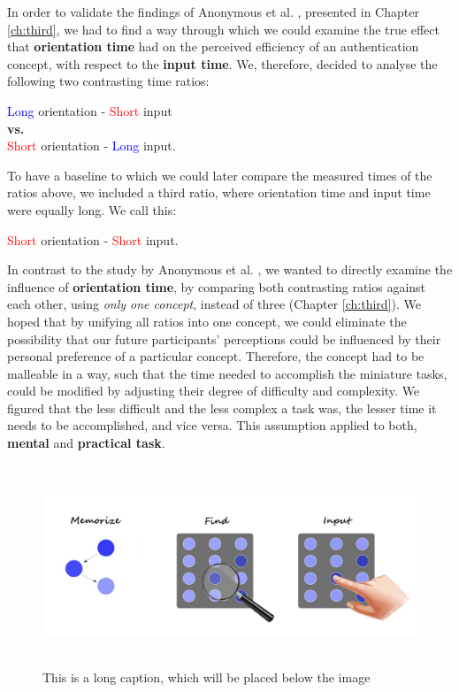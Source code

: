 In order to validate the findings of Anonymous et al. \cite{anonymous}, presented in Chapter \ref{ch:third}, we had to find a way through which we could examine the true effect that \textbf{orientation time} had on the perceived efficiency of an authentication concept, with respect to the \textbf{input time}. We, therefore, decided to analyse the following two contrasting time ratios: 
\begin{center}
    \textcolor{blue}{Long} orientation - \textcolor{red}{Short} input \\
    \textbf{vs.} \\
    \textcolor{red}{Short} orientation - \textcolor{blue}{Long} input.
\end{center} 

To have a baseline to which we could later compare the measured times of the ratios above, we included a third ratio, where orientation time and input time were equally long. We call this:  
\begin{center}
\textcolor{red}{Short} orientation - \textcolor{red}{Short} input.
\end{center} 

In contrast to the study by Anonymous et al. \cite{anonymous}, we wanted to directly examine the influence of \textbf{orientation time}, by comparing both contrasting ratios against each other, using \textit{only one concept}, instead of three (Chapter \ref{ch:third}). We hoped that by unifying all ratios into one concept, we could eliminate the possibility that our future participants' perceptions could be influenced by their personal preference of a particular concept. Therefore, the concept had to be malleable in a way, such that the time needed to accomplish the miniature tasks, could be modified by adjusting their degree of difficulty and complexity. We figured that the less difficult and the less complex a task was, the lesser time it needs to be accomplished, and vice versa. This assumption applied to both, \textbf{mental} and \textbf{practical task}.

\begin{figure}[t!]
\centering
\includegraphics[width=14cm, height=6cm]{Chapters/graphics/ConceptIdea.jpeg}
\caption[This is a short caption for the index]{This is a long caption, which will be placed below the image}
\label{fig:concept}
\end{figure}

